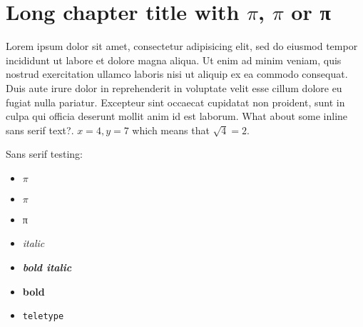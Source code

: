 \chapter{Long chapter title with $\pi$, $π$ or π}

Lorem ipsum dolor sit amet, consectetur adipisicing elit, sed do eiusmod tempor incididunt ut labore et dolore magna aliqua. Ut enim ad minim veniam, quis nostrud exercitation ullamco laboris nisi ut aliquip ex ea commodo consequat. Duis aute irure dolor in reprehenderit in voluptate velit esse cillum dolore eu fugiat nulla pariatur. Excepteur sint occaecat cupidatat non proident, sunt in culpa qui officia deserunt mollit anim id est laborum. \textsf{What about some inline sans serif text?}. $x = 4, y= 7$ which means that $\sqrt{4} = 2$.

Sans serif testing:
\begin{itemize}
    \item \textsf{$\pi$}
    \item \textsf{$π$}
    \item \textsf{π}
    \item \textsf{\emph{italic}}
    \item \textsf{\textbf{\emph{bold italic}}}
    \item \textsf{\textbf{bold}}
    \item \textsf{\texttt{teletype}}
\end{itemize}


